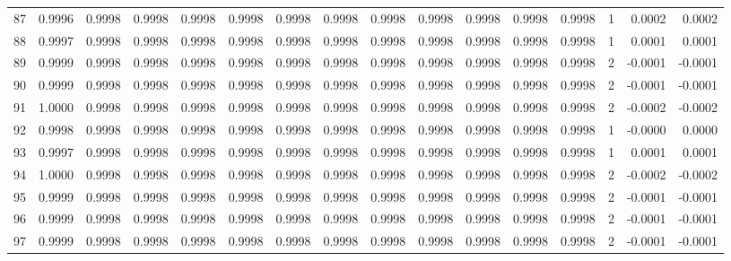 \begin{tabular}{lrrrrrrrrrrrrrrr}
87  &      0.9996 &  0.9998 &  0.9998 &  0.9998 &  0.9998 &  0.9998 &  0.9998 &  0.9998 &  0.9998 &  0.9998 &   0.9998 &     0.9998 &      1 &                    0.0002 &                     0.0002 \\
88  &      0.9997 &  0.9998 &  0.9998 &  0.9998 &  0.9998 &  0.9998 &  0.9998 &  0.9998 &  0.9998 &  0.9998 &   0.9998 &     0.9998 &      1 &                    0.0001 &                     0.0001 \\
89  &      0.9999 &  0.9998 &  0.9998 &  0.9998 &  0.9998 &  0.9998 &  0.9998 &  0.9998 &  0.9998 &  0.9998 &   0.9998 &     0.9998 &      2 &                   -0.0001 &                    -0.0001 \\
90  &      0.9999 &  0.9998 &  0.9998 &  0.9998 &  0.9998 &  0.9998 &  0.9998 &  0.9998 &  0.9998 &  0.9998 &   0.9998 &     0.9998 &      2 &                   -0.0001 &                    -0.0001 \\
91  &      1.0000 &  0.9998 &  0.9998 &  0.9998 &  0.9998 &  0.9998 &  0.9998 &  0.9998 &  0.9998 &  0.9998 &   0.9998 &     0.9998 &      2 &                   -0.0002 &                    -0.0002 \\
92  &      0.9998 &  0.9998 &  0.9998 &  0.9998 &  0.9998 &  0.9998 &  0.9998 &  0.9998 &  0.9998 &  0.9998 &   0.9998 &     0.9998 &      1 &                   -0.0000 &                     0.0000 \\
93  &      0.9997 &  0.9998 &  0.9998 &  0.9998 &  0.9998 &  0.9998 &  0.9998 &  0.9998 &  0.9998 &  0.9998 &   0.9998 &     0.9998 &      1 &                    0.0001 &                     0.0001 \\
94  &      1.0000 &  0.9998 &  0.9998 &  0.9998 &  0.9998 &  0.9998 &  0.9998 &  0.9998 &  0.9998 &  0.9998 &   0.9998 &     0.9998 &      2 &                   -0.0002 &                    -0.0002 \\
95  &      0.9999 &  0.9998 &  0.9998 &  0.9998 &  0.9998 &  0.9998 &  0.9998 &  0.9998 &  0.9998 &  0.9998 &   0.9998 &     0.9998 &      2 &                   -0.0001 &                    -0.0001 \\
96  &      0.9999 &  0.9998 &  0.9998 &  0.9998 &  0.9998 &  0.9998 &  0.9998 &  0.9998 &  0.9998 &  0.9998 &   0.9998 &     0.9998 &      2 &                   -0.0001 &                    -0.0001 \\
97  &      0.9999 &  0.9998 &  0.9998 &  0.9998 &  0.9998 &  0.9998 &  0.9998 &  0.9998 &  0.9998 &  0.9998 &   0.9998 &     0.9998 &      2 &                   -0.0001 &                    -0.0001 \\

\end{tabular}

